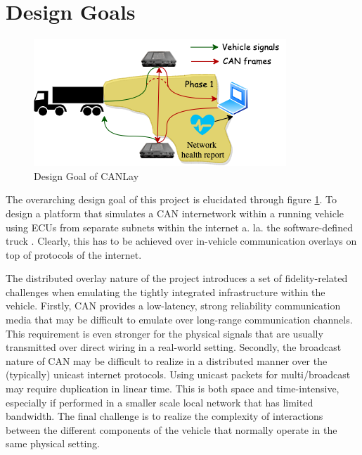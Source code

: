 \documentclass[letterpaper,twocolumn,12pt]{article}
\begin{document}
\section{Design Goals}
\begin{figure}[t!]
    \centering
    \includegraphics[width=\linewidth]{images/design_goal.drawio.png}
    \caption{Design Goal of CANLay}
    \label{fig:goal}
\end{figure}
The overarching design goal of this project is elucidated through figure \ref{fig:goal}. To design a platform that simulates a CAN internetwork within a running vehicle using ECUs from separate subnets within the internet a. la. the software-defined truck \cite{mukherjee_towards_2021}. 
Clearly, this has to be achieved over in-vehicle communication overlays on top of protocols of the internet.

The distributed overlay nature of the project introduces a set of fidelity-related challenges when emulating the tightly integrated infrastructure within the vehicle. 
Firstly, CAN provides a low-latency, strong reliability communication media that may be difficult to emulate over long-range communication channels. This requirement is even stronger for the physical signals that are usually transmitted over direct wiring in a real-world setting. 
Secondly, the broadcast nature of CAN may be difficult to realize in a distributed manner over the (typically) unicast internet protocols. Using unicast packets for multi/broadcast may require duplication in linear time. This is both space and time-intensive, especially if performed in a smaller scale local network that has limited bandwidth.
The final challenge is to realize the complexity of interactions between the different components of the vehicle that normally operate in the same physical setting.
\end{document}
